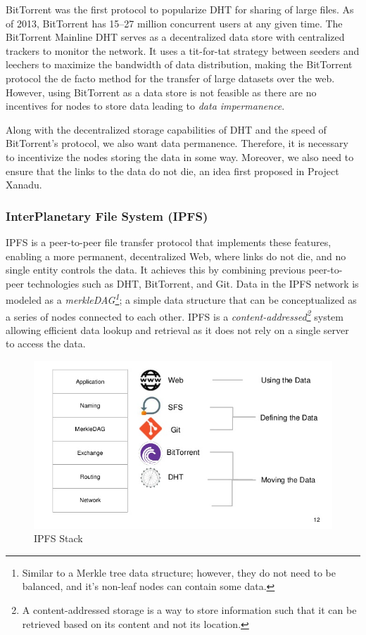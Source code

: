 		BitTorrent\cite{cohen2008bittorrent} was the first protocol to popularize DHT for sharing of large files. As of 2013, BitTorrent has 15–27 million concurrent users at any given time\cite{wang2013measuring}. The BitTorrent Mainline DHT serves as a decentralized data store with centralized trackers to monitor the network. It uses a tit-for-tat strategy between seeders and leechers to maximize the bandwidth of data distribution, making the BitTorrent protocol the de facto method for the transfer of large datasets over the web. However, using BitTorrent as a data store is not feasible as there are no incentives for nodes to store data leading to \textit{data impermanence}.
		
		Along with the decentralized storage capabilities of DHT and the speed of BitTorrent's protocol, we also want data permanence. Therefore, it is necessary to incentivize the nodes storing the data in some way. Moreover, we also need to ensure that the links to the data do not die, an idea first proposed in Project Xanadu\cite{rayward1994visions}.
		
		\subsubsection{InterPlanetary File System (IPFS)}\label{sec:ipfs}
			IPFS\cite{benet2014ipfs} is a peer-to-peer file transfer protocol that implements these features, enabling a more permanent, decentralized Web, where links do not die, and no single entity controls the data. It achieves this by combining previous peer-to-peer technologies such as DHT, BitTorrent, and Git\cite{loeliger2012version}. Data in the IPFS network is modeled as a \textit{merkleDAG\footnote{Similar to a Merkle tree data structure; however, they do not need to be balanced, and it's non-leaf nodes can contain some data.}}; a simple data structure that can be conceptualized as a series of nodes connected to each other\cite{raval2016decentralized}. IPFS is a \textit{content-addressed\footnote{A content-addressed storage is a way to store information such that it can be retrieved based on its content and not its location.}} system allowing efficient data lookup and retrieval as it does not rely on a single server to access the data.
			
			\begin{figure}[h]
				\includegraphics[width=\linewidth]{figures/ipfs-stack}
				\caption{\label{fig:ipfs-stack} IPFS Stack}
			\end{figure}
			
